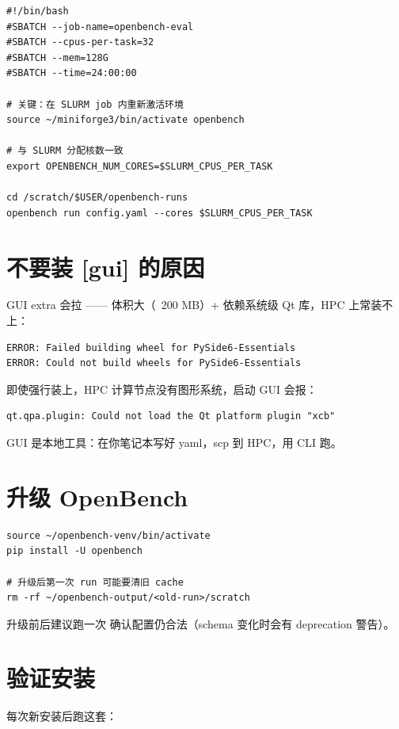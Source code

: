 \begin{verbatim}
#!/bin/bash
#SBATCH --job-name=openbench-eval
#SBATCH --cpus-per-task=32
#SBATCH --mem=128G
#SBATCH --time=24:00:00

# 关键：在 SLURM job 内重新激活环境
source ~/miniforge3/bin/activate openbench

# 与 SLURM 分配核数一致
export OPENBENCH_NUM_CORES=$SLURM_CPUS_PER_TASK

cd /scratch/$USER/openbench-runs
openbench run config.yaml --cores $SLURM_CPUS_PER_TASK
\end{verbatim}

\section{不要装 [gui] 的原因}

GUI extra 会拉  —— 体积大（~200 MB）+ 依赖系统级 Qt 库，HPC 上常装不上：

\begin{verbatim}
ERROR: Failed building wheel for PySide6-Essentials
ERROR: Could not build wheels for PySide6-Essentials
\end{verbatim}

即使强行装上，HPC 计算节点没有图形系统，启动 GUI 会报：

\begin{verbatim}
qt.qpa.plugin: Could not load the Qt platform plugin "xcb"
\end{verbatim}

GUI 是本地工具：在你笔记本写好 yaml，scp 到 HPC，用 CLI 跑。

\section{升级 OpenBench}

\begin{verbatim}
source ~/openbench-venv/bin/activate
pip install -U openbench

# 升级后第一次 run 可能要清旧 cache
rm -rf ~/openbench-output/<old-run>/scratch
\end{verbatim}

升级前后建议跑一次  确认配置仍合法（schema 变化时会有 deprecation 警告）。

\section{验证安装}

每次新安装后跑这套：

